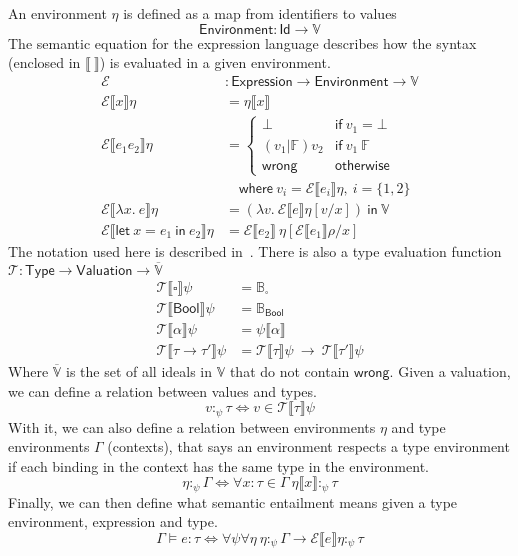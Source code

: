 An environment $\eta$ is defined as a map from identifiers to values
\[ \mathsf{Environment} : \mathsf{Id} \rightarrow \mathbb{V} \]
The semantic equation for the expression language describes how the
syntax (enclosed in $\llbracket\ \rrbracket$) is evaluated in a given environment.
\begin{align*}
  \mathcal{E} &: \mathsf{Expression} \rightarrow \mathsf{Environment} \rightarrow
  \mathbb{V} \\
  \mathcal{E} \llbracket x \rrbracket \eta
  &= \eta \llbracket x \rrbracket \\
  \mathcal{E} \llbracket e_1 e_2 \rrbracket \eta
  &=
    \begin{cases}
      \bot & \mathsf{if} \ v_1 = \bot \\
      (v_1 | \mathbb{F}) v_2 & \mathsf{if} \ v_1 \ \mathbb{F} \\
      \mathsf{wrong} & \mathsf{otherwise}
    \end{cases}
  \\
  & \quad \textsf{where} \ v_i = \mathcal{E} \llbracket e_i \rrbracket \eta , \ i = \{
    1, 2\} \\
  \mathcal{E} \llbracket \lambda x . \ e \rrbracket \eta
  &=
    (\lambda v . \ \mathcal{E} \llbracket e \rrbracket \eta [v / x ])
    \ \mathsf{in} \ \mathbb{V} \\
  \mathcal{E} \llbracket \textsf{let} \ x = e_1 \ \textsf{in} \ e_2 \rrbracket \eta
  &=
    \mathcal{E} \llbracket e_2 \rrbracket \ \eta [ \mathcal{E} \llbracket e_1 \rrbracket\rho / x ]
\end{align*}
The notation used here is described in~\cite{milner1978,damas1984}.
There is also a type evaluation function $\mathcal{T} : \mathsf{Type}
\rightarrow \mathsf{Valuation} \rightarrow \overline{\mathbb{V}}$
\begin{align*}
  \mathcal{T}\llbracket \square \rrbracket\psi &= \mathbb{B}_{ \square } \\
  \mathcal{T}\llbracket \mathsf{Bool} \rrbracket \psi &= \mathbb{B}_{\mathsf{Bool}} \\
  \mathcal{T}\llbracket \alpha \rrbracket \psi &= \psi \llbracket \alpha \rrbracket \\
  \mathcal{T} \llbracket \tau \rightarrow \tau' \rrbracket \psi &= \mathcal{T}\llbracket \tau \rrbracket \psi \ \rightarrow \
                             \mathcal{T} \llbracket \tau' \rrbracket \psi
\end{align*}
Where $\overline{\mathbb{V}}$ is the set of all ideals in $\mathbb{V}$
that do not contain $\mathsf{wrong}$. 
Given a valuation, we can define a relation between values and types.
\[ v :_\psi \tau \iff v \in \mathcal{T} \llbracket \tau \rrbracket\psi \]
With it, we can also define a relation between environments $\eta$ and
type environments $\Gamma$ (contexts), that says an environment respects a
type environment if each binding
in the context has the same type in the environment.
\[ \eta :_\psi \Gamma \iff \forall x : \tau \in \Gamma \ \eta\llbracket x \rrbracket :_\psi \tau\]
Finally, we can then define what semantic entailment means
given a type environment, expression and type.
\[
  \Gamma \vDash e : \tau \iff \forall \psi \forall \eta \ \eta:_\psi \Gamma \rightarrow \mathcal{E} \llbracket e \rrbracket \eta :_\psi \tau
\]

